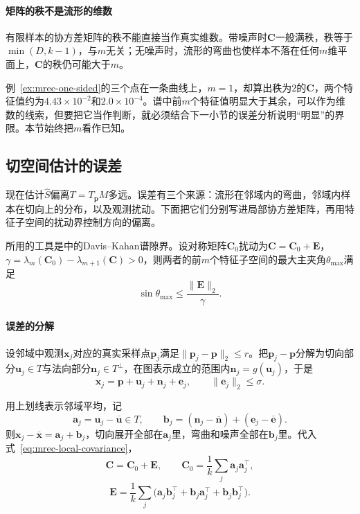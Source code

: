 \paragraph{矩阵的秩不是流形的维数}

有限样本的协方差矩阵的秩不能直接当作真实维数。带噪声时$\bm C$一般满秩，秩等于$\min(D,k-1)$，与$m$无关；无噪声时，流形的弯曲也使样本不落在任何$m$维平面上，$\bm C$的秩仍可能大于$m$。

例~\ref{ex:mrec-one-sided}的三个点在一条曲线上，$m=1$，却算出秩为$2$的$\bm C$，两个特征值约为$4.43\times10^{-2}$和$2.0\times10^{-4}$。谱中前$m$个特征值明显大于其余，可以作为维数的线索，但要把它当作判断，就必须结合下一小节的误差分析说明“明显”的界限。本节始终把$m$看作已知。

\subsection{切空间估计的误差}
\label{sec:mrec-tangent-error}

现在估计$\widehat S$偏离$T=T_{\bm p}M$多远。误差有三个来源：流形在邻域内的弯曲，邻域内样本在切向上的分布，以及观测扰动。下面把它们分别写进局部协方差矩阵，再用特征子空间的扰动界控制方向的偏离。

所用的工具是中的Davis--Kahan谱隙界。设对称矩阵$\bm C_0$扰动为$\bm C=\bm C_0+\bm E$，$\gamma=\lambda_m(\bm C_0)-\lambda_{m+1}(\bm C)>0$，则两者的前$m$个特征子空间的最大主夹角$\theta_{\max}$满足
\begin{equation}
 \sin\theta_{\max}\leq\frac{\lVert\bm E\rVert_2}{\gamma}.
 \label{eq:mrec-davis-kahan}
\end{equation}

\paragraph{误差的分解}

设邻域中观测$\bm x_j$对应的真实采样点$\bm p_j$满足$\lVert\bm p_j-\bm p\rVert_2\leq r$。把$\bm p_j-\bm p$分解为切向部分$\bm u_j\in T$与法向部分$\bm n_j\in T^\perp$，在图表示成立的范围内$\bm n_j=g(\bm u_j)$，于是
\[
 \bm x_j=\bm p+\bm u_j+\bm n_j+\bm e_j,\qquad\lVert\bm e_j\rVert_2\leq\sigma .
\]

用上划线表示邻域平均，记
\[
 \bm a_j=\bm u_j-\overline{\bm u}\in T,\qquad
 \bm b_j=(\bm n_j-\overline{\bm n})+(\bm e_j-\overline{\bm e}).
\]
则$\bm x_j-\overline{\bm x}=\bm a_j+\bm b_j$，切向展开全部在$\bm a_j$里，弯曲和噪声全部在$\bm b_j$里。代入式~\eqref{eq:mrec-local-covariance}，
\[
 \bm C=\bm C_0+\bm E,\qquad\bm C_0=\frac1k\sum_j\bm a_j\bm a_j^\top ,
\]
\[
 \bm E=\frac1k\sum_j\bigl(\bm a_j\bm b_j^\top+\bm b_j\bm a_j^\top+\bm b_j\bm b_j^\top\bigr).
\]

